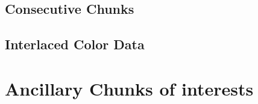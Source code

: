 \subsection{Consecutive Chunks}



\subsection{Interlaced Color Data}

\section{Ancillary Chunks of interests }


